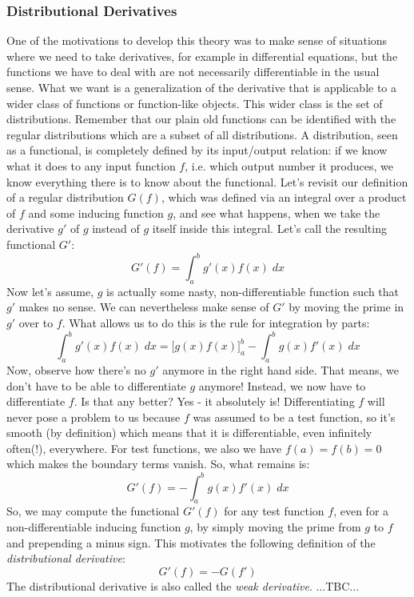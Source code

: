 \subsubsection{Distributional Derivatives}
One of the motivations to develop this theory was to make sense of situations where we need to take derivatives, for example in differential equations, but the functions we have to deal with are not necessarily differentiable in the usual sense. What we want is a generalization of the derivative that is applicable to a wider class of functions or function-like objects. This wider class is the set of distributions. Remember that our plain old functions can be identified with the regular distributions which are a subset of all distributions. A distribution, seen as a functional, is completely defined by its input/output relation: if we know what it does to any input function $f$, i.e. which output number it produces, we know everything there is to know about the functional. Let's revisit our definition of a regular distribution $G(f)$, which was defined via an integral over a product of $f$ and some inducing function $g$, and see what happens, when we take the derivative $g'$ of $g$ instead of $g$ itself inside this integral. Let's call the resulting functional $G'$:
\begin{equation}
 G'(f) = \int_a^b g'(x) f(x) \; dx
\end{equation}
Now let's assume, $g$ is actually some nasty, non-differentiable function such that $g'$ makes no sense. We can nevertheless make sense of $G'$ by moving the prime in $g'$ over to $f$. What allows us to do this is the rule for integration by parts:
\begin{equation}
 \int_a^b g'(x) f(x) \; dx = \Big[g(x) f(x)\Big]_a^b - \int_a^b g(x) f'(x) \; dx
\end{equation}
Now, observe how there's no $g'$ anymore in the right hand side. That means, we don't have to be able to differentiate $g$ anymore! Instead, we now have to differentiate $f$. Is that any better? Yes - it absolutely is! Differentiating $f$ will never pose a problem to us because $f$ was assumed to be a test function, so it's smooth (by definition) which means that it is differentiable, even infinitely often(!), everywhere. For test functions, we also we have $f(a) = f(b) = 0$ which makes the boundary terms vanish. So, what remains is:
\begin{equation}
 G'(f) = - \int_a^b g(x) f'(x) \; dx
\end{equation}
So, we may compute the functional $G'(f)$ for any test function $f$, even for a non-differentiable inducing function $g$, by simply moving the prime from $g$ to $f$ and prepending a minus sign. This motivates the following definition of the \emph{distributional derivative}:
\begin{equation}
  G'(f) = -G(f')
\end{equation}
The distributional derivative is also called the \emph{weak derivative}. ...TBC...

